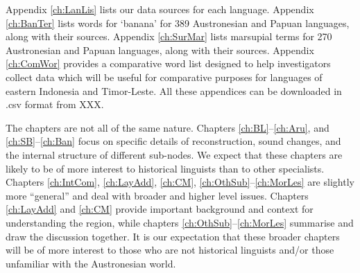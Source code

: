 Appendix \ref{ch:LanLis} lists our data sources for each language.
Appendix \ref{ch:BanTer} lists words for ‘banana’ for 389 Austronesian
and Papuan languages,
along with their sources.
Appendix \ref{ch:SurMar} lists marsupial terms for 270 Austronesian
and Papuan languages,
along with their sources.
Appendix \ref{ch:ComWor} provides a comparative word list designed to help investigators
collect data which will be useful for comparative
purposes for languages of eastern Indonesia
and Timor-Leste.
All these appendices can be downloaded in .csv format
from XXX.

The chapters are not all of the same nature.
Chapters \ref{ch:BL}--\ref{ch:Aru},
and \ref{ch:SB}--\ref{ch:Ban} focus on specific details of reconstruction,
sound changes, and the internal structure of different sub-nodes.
We expect that these chapters are likely to be of more interest to historical linguists than to other specialists.
Chapters \ref{ch:IntCom}, \ref{ch:LayAdd}, \ref{ch:CM},
\ref{ch:OthSub}--\ref{ch:MorLes} are slightly more “general”
and deal with broader
and higher level issues.
Chapters \ref{ch:LayAdd} and \ref{ch:CM} provide important background
and context for understanding the region,
while chapters \ref{ch:OthSub}--\ref{ch:MorLes} summarise
and draw the discussion together.
It is our expectation that these broader chapters will be of more interest to those who are not historical linguists
and/or those unfamiliar with the Austronesian world.
